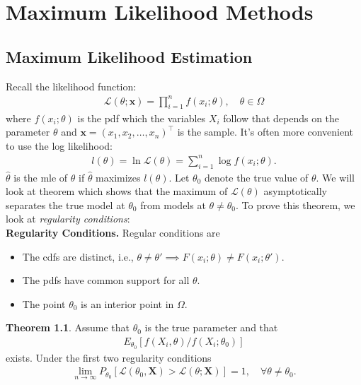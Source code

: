 \documentclass{book}
\theoremstyle{definition}
\newtheorem{thm}{Theorem}[section]
\newcommand{\lag}{\mathcal{L}}
\begin{document}
\newpage



\chapter{Maximum Likelihood Methods}
\newpage

\section{Maximum Likelihood Estimation}

Recall the likelihood function:
\begin{align}
\lag(\theta;\mathbf{x}) = \prod^n_{i=1}f(x_i;\theta), \quad \theta \in \Omega
\end{align}
where $f(x_i;\theta)$ is the pdf which the variables $X_i$ follow that depends on the parameter $\theta$ and $\mathbf{x} = (x_1,x_2,\dots,x_n)^\top$ is the sample. It's often more convenient to use the log likelihood:
\begin{align}
l(\theta) = \ln \lag(\theta) = \sum^n_{i=1}\log f(x_i;\theta).
\end{align}
$\hat{\theta}$ is the mle of $\theta$ if $\hat{\theta}$ maximizes $l(\theta)$. Let $\theta_0$ denote the true value of $\theta$. We will look at theorem which shows that the maximum of $\lag(\theta)$ asymptotically separates the true model at $\theta_0$ from models at $\theta \neq \theta_0$. To prove this theorem, we look at \textit{regularity conditions}:\\


\noindent \textbf{Regularity Conditions.} Regular conditions are
\begin{itemize}
	\item The cdfs are distinct, i.e., $\theta \neq \theta' \implies F(x_i;\theta) \neq F(x_i;\theta')$.
	\item The pdfs have common support for all $\theta$.
	\item The point $\theta_0$ is an interior point in $\Omega$. 
\end{itemize}


\begin{thm}
	Assume that $\theta_0$ is the true parameter and that 
	\begin{align}
	E_{\theta_0}[f(X_i,\theta)/f(X_i;\theta_0)]
	\end{align}
	exists. Under the first two regularity conditions
	\begin{align}
	\lim_{n\to \infty} P_{\theta_0}[\lag(\theta_0,\mathbf{X}) > \lag(\theta;\mathbf{X})] = 1, \quad \forall \theta \neq \theta_0.
	\end{align}
\end{thm}
\end{document}
